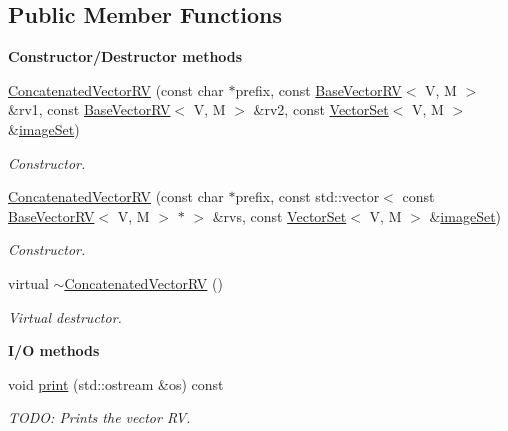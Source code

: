 \subsection*{Public Member Functions}
\begin{Indent}{\bf Constructor/\-Destructor methods}\par
\begin{DoxyCompactItemize}
\item 
\hyperlink{class_q_u_e_s_o_1_1_concatenated_vector_r_v_a72032f6b6104335f66b6c0e3d4c541b2}{Concatenated\-Vector\-R\-V} (const char $\ast$prefix, const \hyperlink{class_q_u_e_s_o_1_1_base_vector_r_v}{Base\-Vector\-R\-V}$<$ V, M $>$ \&rv1, const \hyperlink{class_q_u_e_s_o_1_1_base_vector_r_v}{Base\-Vector\-R\-V}$<$ V, M $>$ \&rv2, const \hyperlink{class_q_u_e_s_o_1_1_vector_set}{Vector\-Set}$<$ V, M $>$ \&\hyperlink{class_q_u_e_s_o_1_1_base_vector_r_v_aa4dd2f036228eac1f945bacc7147a922}{image\-Set})
\begin{DoxyCompactList}\small\item\em Constructor. \end{DoxyCompactList}\item 
\hyperlink{class_q_u_e_s_o_1_1_concatenated_vector_r_v_a213dad6314572cae365b86968afd83ba}{Concatenated\-Vector\-R\-V} (const char $\ast$prefix, const std\-::vector$<$ const \hyperlink{class_q_u_e_s_o_1_1_base_vector_r_v}{Base\-Vector\-R\-V}$<$ V, M $>$ $\ast$ $>$ \&rvs, const \hyperlink{class_q_u_e_s_o_1_1_vector_set}{Vector\-Set}$<$ V, M $>$ \&\hyperlink{class_q_u_e_s_o_1_1_base_vector_r_v_aa4dd2f036228eac1f945bacc7147a922}{image\-Set})
\begin{DoxyCompactList}\small\item\em Constructor. \end{DoxyCompactList}\item 
virtual \hyperlink{class_q_u_e_s_o_1_1_concatenated_vector_r_v_a04abc805feb3662610a8b14d4d087865}{$\sim$\-Concatenated\-Vector\-R\-V} ()
\begin{DoxyCompactList}\small\item\em Virtual destructor. \end{DoxyCompactList}\end{DoxyCompactItemize}
\end{Indent}
\begin{Indent}{\bf I/\-O methods}\par
\begin{DoxyCompactItemize}
\item 
void \hyperlink{class_q_u_e_s_o_1_1_concatenated_vector_r_v_ac479f33e7ef6ff9f17b930aef13fcd7c}{print} (std\-::ostream \&os) const 
\begin{DoxyCompactList}\small\item\em T\-O\-D\-O\-: Prints the vector R\-V. \end{DoxyCompactList}\end{DoxyCompactItemize}
\end{Indent}

